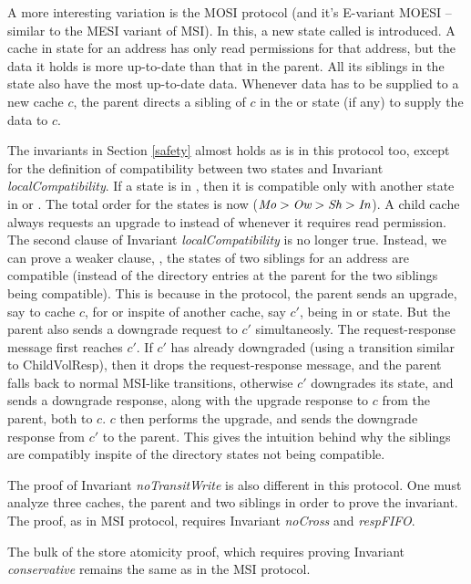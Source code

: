 A more interesting variation is the MOSI protocol (and it's E-variant MOESI --
similar to the MESI variant of MSI). In this, a new state called \Ow{} is
introduced. A cache in \Ow{} state for an address has only read permissions for
that address, but the data it holds is more up-to-date than that in the parent.
All its siblings in the \Sh{} state also have the most up-to-date data.
Whenever data has to be supplied to a new cache $c$, the parent directs a
sibling of $c$ in the \Ow{} or \Mo{} state (if any) to supply the data to $c$.

The invariants in Section \ref{safety} almost holds as is in this protocol too,
except for the definition of compatibility between two states and Invariant
\textit{localCompatibility}. If a state is in \Ow{}, then it is compatible only
with another state in \Sh{} or \In{}. The total order for the states is now
($\textit{Mo} > \textit{Ow} > \textit{Sh} > \textit{In}$). A child cache always requests an upgrade to \Ow{}
instead of \Sh{} whenever it requires read permission. The second clause of
Invariant \textit{localCompatibility} is no longer true. Instead, we can prove
a weaker clause, \viz, the states of two siblings for an address are compatible
(instead of the directory entries at the parent for the two siblings being
compatible).  This is because in the protocol, the parent sends an upgrade, say
to cache $c$, for \Ow{} or \Mo{} inspite of another cache, say $c'$, being in
\Ow{} or \Mo{} state. But the parent also sends a downgrade request to $c'$
simultaneosly. The request-response message first reaches $c'$. If $c'$ has
already downgraded (using a transition similar to ChildVolResp), then it drops
the request-response message, and the parent falls back to normal MSI-like
transitions, otherwise $c'$ downgrades its state, and sends a downgrade
response, along with the upgrade response to $c$ from the parent, both to $c$.
$c$ then performs the upgrade, and sends the downgrade response from $c'$ to
the parent. This gives the intuition behind why the siblings are compatibly
inspite of the directory states not being compatible.

The proof of Invariant \textit{noTransitWrite} is also different in this
protocol. One must analyze three caches, the parent and two siblings in order
to prove the invariant. The proof, as in MSI protocol, requires Invariant
\textit{noCross} and \textit{respFIFO}.

The bulk of the store atomicity proof, which requires proving Invariant
\textit{conservative} remains the same as in the MSI protocol.
